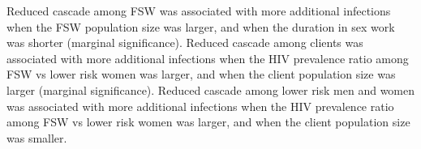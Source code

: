 Reduced cascade among FSW was associated with more additional infections when
the FSW population size was larger, and when
the duration in sex work was shorter (marginal significance).
Reduced cascade among clients was associated with more additional infections when
the HIV prevalence ratio among FSW vs lower risk women was larger,
and when the client population size was larger (marginal significance).
Reduced cascade among lower risk men and women was associated with more additional infections when
the HIV prevalence ratio among FSW vs lower risk women was larger,
and when the client population size was smaller.